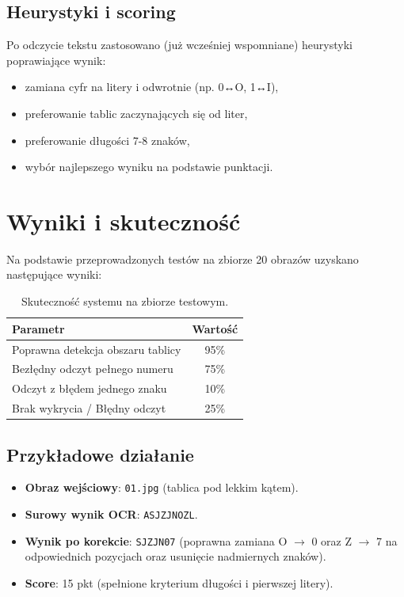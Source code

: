 \documentclass[12pt,a4paper]{article}
\begin{document}
\subsection{Heurystyki i scoring}
Po odczycie tekstu zastosowano (już wcześniej wspomniane) heurystyki poprawiające wynik:
\begin{itemize}
    \item zamiana cyfr na litery i odwrotnie (np. 0↔O, 1↔I),
    \item preferowanie tablic zaczynających się od liter,
    \item preferowanie długości 7-8 znaków,
    \item wybór najlepszego wyniku na podstawie punktacji.
\end{itemize}

\section{Wyniki i skuteczność}

Na podstawie przeprowadzonych testów na zbiorze 20 obrazów uzyskano następujące wyniki:

\begin{table}[H]
\centering
\begin{tabular}{|l|c|}
\hline
\textbf{Parametr} & \textbf{Wartość} \\ \hline
Poprawna detekcja obszaru tablicy & 95\% \\ \hline
Bezłędny odczyt pełnego numeru & 75\% \\ \hline
Odczyt z błędem jednego znaku & 10\% \\ \hline
Brak wykrycia / Błędny odczyt & 25\% \\ \hline
\end{tabular}
\caption{Skuteczność systemu na zbiorze testowym.}
\end{table}

\subsection{Przykładowe działanie}
\begin{itemize}
    \item \textbf{Obraz wejściowy}: \texttt{01.jpg} (tablica pod lekkim kątem).
    \item \textbf{Surowy wynik OCR}: \texttt{ASJZJNOZL}.
    \item \textbf{Wynik po korekcie}: \texttt{SJZJN07} (poprawna zamiana O $\to$ 0 oraz Z $\to$ 7 na odpowiednich pozycjach oraz usunięcie nadmiernych znaków).
    \item \textbf{Score}: 15 pkt (spełnione kryterium długości i pierwszej litery).
\end{itemize}
\end{document}
